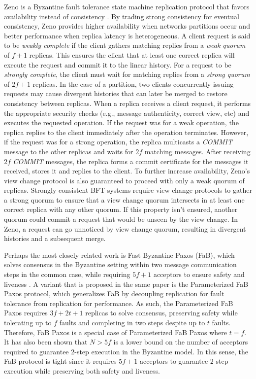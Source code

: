 Zeno is a Byzantine fault tolerance state machine replication protocol that favors availability instead of consistency \cite{Singh2009}. By trading strong consistency for eventual consistency, Zeno provides higher availability when networks partitions occur and better performance when replica latency is heterogeneous.  A client request is said to be \textit{weakly complete} if the client gathers matching replies from a \textit{weak quorum} of $f+1$ replicas. This ensures the client that at least one correct replica will execute the request and commit it to the linear history. For a request to be \textit{strongly complete}, the client must wait for matching replies from a \textit{strong quorum} of $2f+1$ replicas. In the case of a partition, two clients concurrently issuing requests may cause divergent histories that can later be merged to restore consistency between replicas. When a replica receives a client request, it performs the appropriate security checks (e.g., message authenticity, correct view, etc) and executes the requested operation. If the request was for a weak operation, the replica replies to the client immediately after the operation terminates. However, if the request was for a strong operation, the replica multicasts a \textit{COMMIT} message to the other replicas and waits for $2f$ matching messages. After receiving $2f$ \textit{COMMIT} messages, the replica forms a commit certificate for the messages it received, stores it and replies to the client. To further increase availability, Zeno's view change protocol is also guaranteed to proceed with only a weak quorum of replicas. Strongly consistent BFT systems require view change protocols to gather a strong quorum to ensure that a view change quorum intersects in at least one correct replica with any other quorum. If this property isn't ensured, another quorum could commit a request that would be unseen by the view change. In Zeno, a request can go unnoticed by view change quorum, resulting in divergent histories and a subsequent merge. \par
Perhaps the most closely related work is Fast Byzantine Paxos (FaB), which solves consensus in the Byzantine setting within two message communication steps in the common case, while requiring $5f+1$ acceptors to ensure safety and liveness \cite{Martin2006}. A variant that is proposed in the same paper is the Parameterized FaB Paxos protocol, which generalizes FaB by decoupling replication for fault tolerance from replication for performance. As such, the Parameterized FaB Paxos requires $3f+2t+1$ replicas to solve consensus, preserving safety while tolerating up to $f$ faults and completing in two steps despite up to $t$ faults. Therefore, FaB Paxos is a special case of Parameterized FaB Paxos where $t=f$. It has also been shown that $N>5f$ is a lower bound on the number of acceptors required to guarantee 2-step execution in the Byzantine model. In this sense, the FaB protocol is tight since it requires $5f+1$ acceptors to guarantee 2-step execution while preserving both safety and liveness. 

